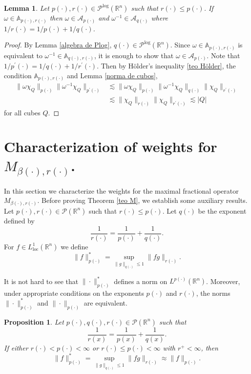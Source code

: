 \documentclass[a4paper,11pt,reqno]{amsart}
\theoremstyle{plain}
\numberwithin{equation}{section}
\newtheorem{lema}[teo]{Lemma}
\newtheorem{propo}[teo]{Proposition}
\theoremstyle{definition}
\newcommand{\R}{{\mathbb{R}^n}}
\begin{document}
\begin{lema}\label{Apr implica Ap}
	Let ${p(\cdot)},{r(\cdot)}\in\mathcal{P}^{\mathrm{log}}(\R)$ such that ${r(\cdot)}\leq{p(\cdot)}$. If $\omega\in\mathbb{A}_{{p(\cdot)},{r(\cdot)}}$ then $\omega\in\mathcal{A}_{p(\cdot)}$ and $\omega^{-1}\in \mathcal{A}_{{q(\cdot)}}$ where $1/r(\cdot)=1/p(\cdot)+1/q(\cdot)$.
\end{lema}
\begin{proof} By Lemma \ref{algebra de Plog}, $q(\cdot)\in\mathcal{P}^{\mathrm{log}}(\R)$.  Since $\omega\in \mathbb{A}_{p(\cdot),r(\cdot)}$ is equivalent to $\omega^{-1}\in\mathbb{A}_{q(\cdot),r(\cdot)}$, it is enough to show that $\omega\in\mathcal{A}_{p(\cdot)}$. Note that $1/p^\prime(\cdot)=1/q(\cdot)+1/r^\prime(\cdot).$ Then by Hölder's inequality \ref{teo Hölder}, the condition $\mathbb{A}_{p(\cdot),r(\cdot)}$ and Lemma \ref{norma de cubos}, 
	\begin{align*}
		\|\omega\chi_Q\|_{p(\cdot)}\|\omega^{-1}\chi_Q\|_{p^\prime(\cdot)}&\lesssim \|\omega\chi_Q\|_{p(\cdot)}\|\omega^{-1}\chi_Q\|_{q(\cdot)}\|\chi_Q\|_{r^\prime(\cdot)}\\
		&\lesssim\|\chi_Q\|_{r(\cdot)}\|\chi_Q\|_{r^\prime(\cdot)}
		\lesssim|Q|
	\end{align*}
	 for all cubes $Q$.
\end{proof}

\section{Characterization of weights for $M_{\beta(\cdot),r(\cdot)}$. }\label{sec 3}
In this section we characterize the weights for the maximal fractional operator $M_{\beta(\cdot),r(\cdot)}$. Before proving Theorem \ref{teo M}, we establish some auxiliary results.
	Let $p(\cdot),{r(\cdot)}\in\mathcal{P}(\R)$ such that ${r(\cdot)}\leq{p(\cdot)}$. Let ${q(\cdot)}$ be the exponent defined by	$$\frac{1}{r(\cdot)}=\frac{1}{p(\cdot)}+\frac{1}{q(\cdot)}.$$ 
	For $f\in L^1_{\text{loc}}(\R)$ we define
	\begin{equation}\label{norma conjugada}
		\|f\|^\ast_{p(\cdot)}=\underset{\|g\|_{q(\cdot)}\leq1}{\sup}\|fg\|_{r(\cdot)}.
	\end{equation}


It is not hard to see that $\|\cdot\|^\ast_{p(\cdot)}$ defines a norm on $L^{p(\cdot)}(\R)$. Moreover, under appropriate conditions on the exponents ${p(\cdot)}$ and ${r(\cdot)}$, the norms $\|\cdot\|^\ast_{p(\cdot)}$ and $\|\cdot\|_{p(\cdot)}$ are equivalent.
\begin{propo}\label{propo norma conjugada}
	Let ${p(\cdot)},{q(\cdot)},{r(\cdot)}\in\mathcal{P}(\R)$ such that 
	$$\frac{1}{r(x)}=\frac{1}{p(x)}+\frac{1}{q(x)}.$$ 
	If either $r(\cdot)<p(\cdot)<\infty$ or $r(\cdot)\leq p(\cdot)<\infty$ with $r^+<\infty$, then 
	\begin{equation*}
		\|f\|^\ast_{p(\cdot)}=\underset{\|g\|_{q(\cdot)}\leq1}{\sup}\|fg\|_{r(\cdot)}\approx\|f\|_{p(\cdot)}.
	\end{equation*}
\end{propo}
\end{document}
